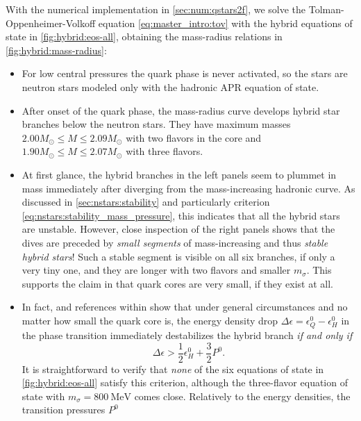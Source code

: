 With the numerical implementation in \cref{sec:num:qstars2f},
we solve the Tolman-Oppenheimer-Volkoff equation \eqref{eq:master_intro:tov} with the hybrid equations of state in \cref{fig:hybrid:eos-all},
obtaining the mass-radius relations in \cref{fig:hybrid:mass-radius}:
\begin{itemize}
\item For low central pressures the quark phase is never activated, so the stars are neutron stars modeled only with the hadronic APR equation of state.
\item After onset of the quark phase, the mass-radius curve develops hybrid star branches below the neutron stars.
      They have maximum masses $2.00 M_\odot \leq M \leq 2.09 M_\odot$ with two flavors in the core
      and $1.90 M_\odot \leq M \leq 2.07 M_\odot$ with three flavors.
\item At first glance, the hybrid branches in the left panels seem to plummet in mass immediately after diverging from the mass-increasing hadronic curve.
      As discussed in \cref{sec:nstars:stability} and particularly criterion \eqref{eq:nstars:stability_mass_pressure},
      this indicates that all the hybrid stars are unstable.
      However, close inspection of the right panels shows that the dives are preceded by \emph{small segments} of mass-increasing and thus \emph{stable hybrid stars}!
      Such a stable segment is visible on all six branches, if only a very tiny one,
      and they are longer with two flavors and smaller $m_\sigma$.
      This supports the claim in \cite{ref:quark_star_review} that quark cores are very small, if they exist at all.
\item In fact, \cite[equation 15]{ref:hybrid_star_stability_criterion} and references within show that under general circumstances and no matter how small the quark core is,
      the energy density drop $\Delta \epsilon = \epsilon_Q^0 - \epsilon_H^0$ in the phase transition
      immediately destabilizes the hybrid branch \emph{if and only if}
      \begin{equation}
          \Delta \epsilon > \frac12 \epsilon_H^0 + \frac32 P^0.
      \label{eq:hybrid:stability_criterion}
      \end{equation}
      It is straightforward to verify that \emph{none} of the six equations of state in \cref{fig:hybrid:eos-all} satisfy this criterion,
      although the three-flavor equation of state with $m_\sigma=\SI{800}{\mega\electronvolt}$ comes close.
      Relatively to the energy densities,
      the transition pressures $P^0$

\end{itemize}
